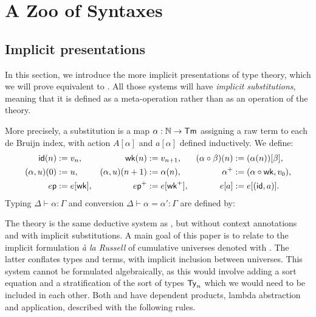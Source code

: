 \section{A Zoo of Syntaxes}\label{implicit-presentations}

\subsection{Implicit presentations}

In this section, we introduce the more implicit presentations of type theory, which we will prove equivalent to \ThyGAT.
All those systems will have \emph{implicit substitutions}, meaning that it is defined as a meta-operation rather than as an operation of the theory.

More precisely, a substitution is a map $\alpha : \mathbb{N} \to \mathsf{Tm}$ assigning a raw term to each de Bruijn index, with action $A[\alpha]$ and $a[\alpha]$ defined inductively. We define: 
\begin{align*}
    \mathsf{id}(n) &:= v_n, &
    \mathsf{wk}(n) &:= v_{n+1}, &
    (\alpha \circ \beta)(n) &:= (\alpha(n))[\beta], \\
    (\alpha, u)(0) &:= u, &
    (\alpha, u)(n+1) &:= \alpha(n), &
    \alpha^+ &:= (\alpha \circ \mathsf{wk}, v_0), \\
    e\mathsf{p} &:= e[\mathsf{wk}], &
    e\mathsf{p}^+ &:= e[\mathsf{wk}^+], &
    e[a] &:= e[(\mathsf{id}, a)].
\end{align*}
Typing $\Delta \vdash \alpha : \Gamma$ and conversion $\Delta \vdash \alpha = \alpha' : \Gamma$ are defined by:


The theory \ThyTarski is the same deductive system as \ThyGAT, but without context annotations and with implicit substitutions.
A main goal of this paper is to relate \ThyTarski to the implicit formulation \textit{à la Russell} of cumulative universes denoted with \ThyRussell.
The latter conflates types and terms, with implicit inclusion between universes. 
This system cannot be formulated algebraically, as this would involve adding a sort equation and a stratification of the sort of types $\mathsf{Ty}_n$ which we would need to be included in each other.
Both \ThyTarski and \ThyRussell have dependent products, lambda abstraction and application, described with the following rules.


